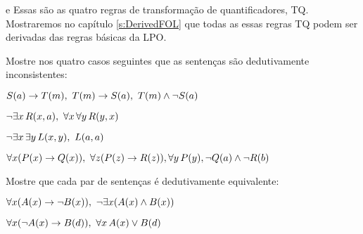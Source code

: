  
e
Essas são as quatro regras de transformação de quantificadores, TQ. Mostraremos no  capítulo \ref{s:DerivedFOL} que todas as essas regras TQ podem ser derivadas das regras básicas da LPO. 


\practiceproblems
\problempart
 Mostre nos quatro casos seguintes que as sentenças são dedutivamente inconsistentes:
\begin{earg}
\item $\mathord{S}(a)\rightarrow \mathord{T}(m),\,\, \mathord{T}(m) \rightarrow \mathord{S}(a),\,\, \mathord{T}(m) \wedge \neg \mathord{S}(a)$
\item $\neg\exists x\,\mathord{R}(x,a),\,\,  \forall x\, \forall y\,\mathord{R}(y,x)$
\item $\neg\exists x\, \exists y\,\mathord{L}(x,y),\,\,  \mathord{L}(a,a)$
\item $\forall x(\mathord{P}(x) \rightarrow \mathord{Q}(x)),\,\,  \forall z(\mathord{P}(z) \rightarrow \mathord{R}(z)), \forall y\,\mathord{P}(y), \neg \mathord{Q}(a) \wedge \neg \mathord{R}(b)$
\end{earg}

\problempart
Mostre que cada par de sentenças é dedutivamente equivalente:
\begin{earg}
\item $\forall x (\mathord{A}(x)\rightarrow \neg \mathord{B}(x)),\,\,  \neg\exists x(\mathord{A}(x) \wedge \mathord{B}(x))$
\item $\forall x (\neg\mathord{A}(x)\rightarrow \mathord{B}(d)),\,\,  \forall x\,\mathord{A}(x) \vee \mathord{B}(d)$
\end{earg}

